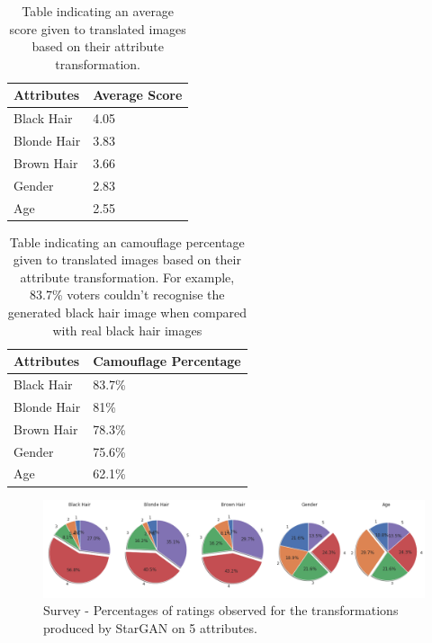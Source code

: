\documentclass[preprint,12pt]{elsarticle}
\begin{document}
\begin{table}[ht]
\centering
\begin{tabular}{l l}
\hline
\textbf{Attributes} & \textbf{Average Score}\\
\hline
Black Hair & 4.05 \\
Blonde Hair & 3.83 \\
Brown Hair & 3.66 \\
Gender & 2.83 \\
Age & 2.55 \\
\hline
\end{tabular}
\caption{Table indicating an average score given to translated images based on their attribute transformation.}
\label{table:Avg_score}
\end{table}

\begin{table}[ht]
\centering
\begin{tabular}{l l}
\hline
\textbf{Attributes} & \textbf{Camouflage Percentage}\\
\hline
Black Hair & 83.7\% \\
Blonde Hair & 81\% \\
Brown Hair & 78.3\% \\
Gender & 75.6\% \\
Age & 62.1\% \\
\hline
\end{tabular}
\caption{Table indicating an camouflage percentage given to translated images based on their attribute transformation. For example, 83.7\% voters couldn't recognise the generated black hair image when compared with real black hair images}
\label{table:Camou}
\end{table}

\begin{figure}[ht]
\centering\includegraphics[width=0.7\linewidth]{survey_1_summary.png}
\caption{Survey - Percentages of ratings observed for the transformations produced by StarGAN on 5 attributes.}
\label{fig:summary_1_survey}
\end{figure}
\end{document}
